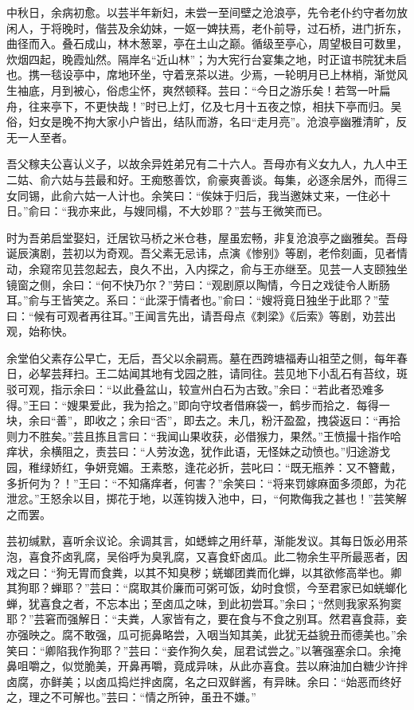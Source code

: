 \documentclass[]{article}
\begin{document}
中秋日，余病初愈。以芸半年新妇，未尝一至间壁之沧浪亭，先令老仆约守者勿放闲人，于将晚时，偕芸及余幼妹，一妪一婢扶焉，老仆前导，过石桥，进门折东，曲径而入。叠石成山，林木葱翠，亭在土山之巅。循级至亭心，周望极目可数里，炊烟四起，晚霞灿然。隔岸名``近山林''；为大宪行台宴集之地，时正谊书院犹未启也。携一毯设亭中，席地环坐，守着烹茶以进。少焉，一轮明月已上林梢，渐觉风生袖底，月到被心，俗虑尘怀，爽然顿释。芸曰：``今日之游乐矣！若驾一叶扁舟，往来亭下，不更快哉！''时已上灯，亿及七月十五夜之惊，相扶下亭而归。吴俗，妇女是晚不拘大家小户皆出，结队而游，名曰``走月亮''。沧浪亭幽雅清旷，反无一人至者。

吾父稼夫公喜认义子，以故余异姓弟兄有二十六人。吾母亦有义女九人，九人中王二姑、俞六姑与芸最和好。王痴憨善饮，俞豪爽善谈。每集，必逐余居外，而得三女同锡，此俞六姑一人计也。余笑曰：``俟妹于归后，我当邀妹丈来，一住必十日。''俞曰：``我亦来此，与嫂同榻，不大妙耶？''芸与王微笑而已。

时为吾弟启堂娶妇，迁居钦马桥之米仓巷，屋虽宏畅，非复沧浪亭之幽雅矣。吾母诞辰演剧，芸初以为奇观。吾父素无忌讳，点演《惨别》等剧，老伶刻画，见者情动，余窥帘见芸忽起去，良久不出，入内探之，俞与王亦继至。见芸一人支颐独坐镜窗之侧，余曰：``何不快乃尔？''劳曰：``观剧原以陶情，今日之戏徒令人断肠耳。''俞与王皆笑之。系曰：``此深于情者也。''俞曰：``嫂将竟日独坐于此耶？''莹曰：``候有可观者再往耳。''王闻言先出，请吾母点《刺梁》《后索》等剧，劝芸出观，始称快。

余堂伯父素存公早亡，无后，吾父以余嗣焉。墓在西跨塘福寿山祖茔之侧，每年春日，必挈芸拜扫。王二姑闻其地有戈园之胜，请同往。芸见地下小乱石有苔纹，斑驳可观，指示余曰：``以此叠盆山，较宣州白石为古致。''余曰：``若此者恐难多得。''王曰：``嫂果爱此，我为拾之。''即向守坟者借麻袋一，鹤步而拾之．每得一块，余曰``善''，即收之；余曰``否''，即去之。未几，粉汗盈盈，拽袋返曰：``再拾则力不胜矣。''芸且拣且言曰：``我闻山果收获，必借猴力，果然。''王愤撮十指作哈痒状，余横阻之，责芸曰：``人劳汝逸，犹作此语，无怪妹之动愤也。''归途游戈园，稚绿娇红，争妍竞媚。王素憨，逢花必折，芸叱曰：``既无瓶养：又不簪戴，多折何为？！''王曰：``不知痛痒者，何害？''余笑曰：``将来罚嫁麻面多须郎，为花泄忿。''王怒余以目，掷花于地，以莲钩拨入池中，曰，``何欺侮我之甚也！''芸笑解之而罢。

芸初缄默，喜听余议论。余调其言，如蟋蟀之用纤草，渐能发议。其每日饭必用茶泡，喜食芥卤乳腐，吴俗呼为臭乳腐，又喜食虾卤瓜。此二物余生平所最恶者，因戏之曰：``狗无胃而食粪，以其不知臭秽；蜣螂团粪而化蝉，以其欲修高举也。卿其狗耶？蝉耶？''芸曰：``腐取其价廉而可粥可饭，幼时食惯，今至君家已如蜣螂化蝉，犹喜食之者，不忘本出；至卤瓜之味，到此初尝耳。''余曰；``然则我家系狗窦耶？''芸窘而强解日：``夫粪，人家皆有之，要在食与不食之别耳。然君喜食蒜，妾亦强映之。腐不敢强，瓜可扼鼻略尝，入咽当知其美，此犹无益貌丑而德美也。''余笑曰：``卿陷我作狗耶？''芸曰：``妾作狗久矣，屈君试尝之。''以箸强塞余口。余掩鼻咀嚼之，似觉脆美，开鼻再嚼，竟成异味，从此亦喜食。芸以麻油加白糖少许拌卤腐，亦鲜美；以卤瓜捣烂拌卤腐，名之曰双鲜酱，有异昧。余曰：``始恶而终好之，理之不可解也。''芸曰：``情之所钟，虽丑不嫌。''
\end{document}
